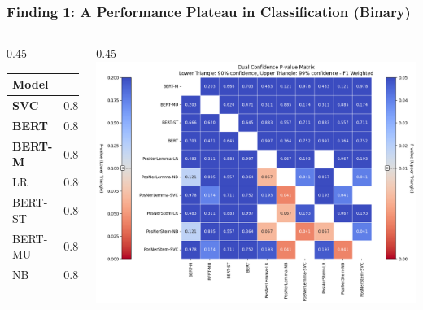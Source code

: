 \documentclass[aspectratio=169]{beamer}
\begin{document}
\begin{frame}
  \frametitle{Finding 1: A Performance Plateau in Classification (Binary)}
  \begin{columns}[T]
    \begin{column}{0.45\textwidth}
      \small
      \begin{table}[H]
        \centering
          \begin{tabular}{@{}lc@{}}
              \toprule
              \textbf{Model} & \textbf{Weighted F1} \\
              \midrule
              \textbf{SVC} & $0.87 \pm 0.03\,[0.83, 0.91]$ \\
              \textbf{BERT} & $0.87 \pm 0.02\,[0.84, 0.90]$ \\
              \textbf{BERT-M} & $0.87 \pm 0.02\,[0.84, 0.90]$ \\
              LR & $0.86 \pm 0.02\,[0.83, 0.90]$ \\
              BERT-ST & $0.86 \pm 0.02\,[0.82, 0.89]$ \\
              BERT-MU & $0.86 \pm 0.03\,[0.82, 0.89]$ \\
              NB & $0.84 \pm 0.03\,[0.81, 0.88]$ \\
              \bottomrule
          \end{tabular}
    \end{table}
    \end{column}
    \begin{column}{0.45\textwidth}
      \centering
      \includegraphics[width=\textwidth]{rsc/binary_statistical_tests2.png}
    \end{column}
  \end{columns}


\end{frame}
\end{document}
